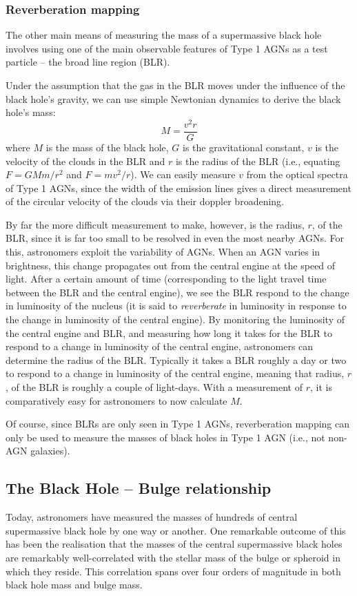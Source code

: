 \documentclass[11pt]{article}
\begin{document}
\subsubsection{Reverberation mapping}
The other main means of measuring the mass of a supermassive black
hole involves using one of the main observable features of Type 1 AGNs
as a test particle -- the broad line region (BLR).

Under the assumption that the gas in the BLR moves under the influence
of the black hole's gravity, we can use simple Newtonian dynamics to
derive the black hole's mass:
\begin{equation}
M = \frac{v^2r}{G}
\end{equation}
where $M$ is the mass of the black hole, $G$ is the gravitational
constant, $v$ is the velocity of the clouds in the BLR and $r$ is the
radius of the BLR (i.e., equating $F=GMm/r^2$ and $F=mv^2/r$). We can
easily measure $v$ from the optical spectra of Type 1 AGNs, since the
width of the emission lines gives a direct measurement of the circular
velocity of the clouds via their doppler broadening.

By far the more difficult measurement to make, however, is the radius,
$r$, of the BLR, since it is far too small to be resolved in even the
most nearby AGNs. For this, astronomers exploit the variability of
AGNs. When an AGN varies in brightness, this change propagates out
from the central engine at the speed of light. After a certain amount
of time (corresponding to the light travel time between the BLR and
the central engine), we see the BLR respond to the change in
luminosity of the nucleus (it is said to {\it reverberate} in
luminosity in response to the change in luminosity of the central
engine). By monitoring the luminosity of the central engine and BLR,
and measuring how long it takes for the BLR to respond to a change in
luminosity of the central engine, astronomers can determine the radius
of the BLR. Typically it takes a BLR roughly a day or two to respond
to a change in luminosity of the central engine, meaning that radius,
$r$, of the BLR is roughly a couple of light-days. With a measurement
of $r$, it is comparatively easy for astronomers to now calculate $M$.

Of course, since BLRs are only seen in Type 1 AGNs, reverberation
mapping can only be used to measure the masses of black holes in Type
1 AGN (i.e., not non-AGN galaxies).

\subsection{The Black Hole -- Bulge relationship}
Today, astronomers have measured the masses of hundreds of central
supermassive black hole by one way or another. One remarkable outcome
of this has been the realisation that the masses of the central
supermassive black holes are remarkably well-correlated with the
stellar mass of the bulge or spheroid in which they reside. This
correlation spans over four orders of magnitude in both black hole
mass and bulge mass.
\end{document}
